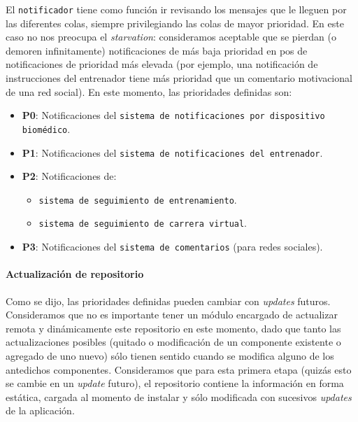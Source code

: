 El \texttt{notificador} tiene como función ir revisando los mensajes que le lleguen por las diferentes colas, siempre privilegiando las colas de mayor prioridad. En este caso no nos preocupa el \emph{starvation}: consideramos aceptable que se pierdan (o demoren infinitamente) notificaciones de más baja prioridad en pos de notificaciones de prioridad más elevada (por ejemplo, una notificación de instrucciones del entrenador tiene más prioridad que un comentario motivacional de una red social). En este momento, las prioridades definidas son:
\begin{itemize}
	\item \textbf{P0}: Notificaciones del \texttt{sistema de notificaciones por dispositivo biomédico}. 
	\item \textbf{P1}: Notificaciones del \texttt{sistema de notificaciones del entrenador}.
	\item \textbf{P2}: Notificaciones de: 
	\begin{itemize}
		\item \texttt{sistema de seguimiento de entrenamiento}.
		\item \texttt{sistema de seguimiento de carrera virtual}.
	\end{itemize}
	\item \textbf{P3}: Notificaciones del \texttt{sistema de comentarios} (para redes sociales).
\end{itemize}

\paragraph{Actualización de repositorio}
Como se dijo, las prioridades definidas pueden cambiar con \emph{updates} futuros. Consideramos que no es importante tener un módulo encargado de actualizar remota y dinámicamente este repositorio en este momento, dado que tanto las actualizaciones posibles (quitado o modificación de un componente existente o agregado de uno nuevo) sólo tienen sentido cuando se modifica alguno de los antedichos componentes. Consideramos que para esta primera etapa (quizás esto se cambie en un \emph{update} futuro), el repositorio contiene la información en forma estática, cargada al momento de instalar y sólo modificada con sucesivos \emph{updates} de la aplicación.